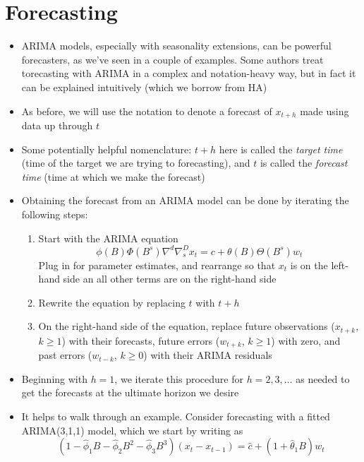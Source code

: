 \documentclass{article}
\begin{document}
\section{Forecasting}

\begin{itemize}
\item ARIMA models, especially with seasonality extensions, can be powerful 
  forecasters, as we've seen in a couple of examples. Some authors treat
  torecasting with ARIMA in a complex and notation-heavy way, but in fact it can
  be explained intuitively (which we borrow from HA)

\item As before, we will use the notation  to denote
  a forecast of $x_{t+h}$ made using data up through $t$

\item Some potentially helpful nomenclature: $t+h$ here is called the
  \emph{target time} (time of the target we are trying to forecasting), and $t$
  is called the \emph{forecast time} (time at which we make the forecast) 

\item Obtaining the forecast  from an ARIMA model can 
  be done by iterating the following steps: 

\begin{enumerate}
\item Start with the ARIMA equation
  \[
  \phi(B) \Phi(B^s) \nabla^d \nabla_s^D x_t = c + \theta(B) \Theta(B^s) w_t   
  \]
  Plug in for parameter estimates, and rearrange so that $x_t$ is on the
  left-hand side an all other terms are on the right-hand side 

\item Rewrite the equation by replacing $t$ with $t+h$

\item On the right-hand side of the equation, replace future observations
  ($x_{t+k}$, $k \geq 1$) with their forecasts, future errors ($w_{t+k}$, $k
  \geq 1$) with zero, and past errors ($w_{t-k}$, $k \geq 0$) with their ARIMA 
  residuals   
\end{enumerate}

\item Beginning with $h = 1$, we iterate this procedure for $h = 2,3,\dots$ as
  needed to get the forecasts at the ultimate horizon we desire  

\item It helps to walk through an example. Consider forecasting with a fitted 
  ARIMA(3,1,1) model, which we start by writing as
  \[
  (1 - \hat\phi_1 B - \hat\phi_2 B^2 - \hat\phi_3 B^3) (x_t - x_{t-1}) = \hat{c}
  + (1 + \hat\theta_1 B) w_t
  \]


\end{itemize}
\end{document}
